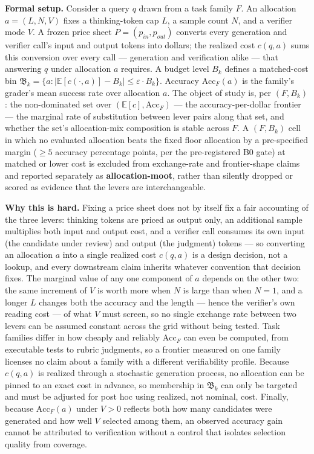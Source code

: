\documentclass[11pt]{article}
\begin{document}
\noindent\textbf{Formal setup.} Consider a query $q$ drawn from a task family $F$. An allocation $a = (L, N, V)$ fixes a thinking-token cap $L$, a sample count $N$, and a verifier mode $V$. A frozen price sheet $P = (p_{in}, p_{out})$ converts every generation and verifier call's input and output tokens into dollars; the realized cost $c(q,a)$ sums this conversion over every call --- generation and verification alike --- that answering $q$ under allocation $a$ requires. A budget level $B_k$ defines a matched-cost bin $\mathfrak{B}_k = \{a : |\mathbb{E}[c(\cdot,a)] - B_k| \leq \varepsilon \cdot B_k\}$. Accuracy $\text{Acc}_F(a)$ is the family's grader's mean success rate over allocation $a$. The object of study is, per $(F, B_k)$: the non-dominated set over $(\mathbb{E}[c], \text{Acc}_F)$ --- the accuracy-per-dollar frontier --- the marginal rate of substitution between lever pairs along that set, and whether the set's allocation-mix composition is stable across $F$. A $(F, B_k)$ cell in which no evaluated allocation beats the fixed floor allocation by a pre-specified margin ($\geq 5$ accuracy percentage points, per the pre-registered B0 gate) at matched or lower cost is excluded from exchange-rate and frontier-shape claims and reported separately as \textbf{allocation-moot}, rather than silently dropped or scored as evidence that the levers are interchangeable.

\noindent\textbf{Why this is hard.} Fixing a price sheet does not by itself fix a fair accounting of the three levers: thinking tokens are priced as output only, an additional sample multiplies both input and output cost, and a verifier call consumes its own input (the candidate under review) and output (the judgment) tokens --- so converting an allocation $a$ into a single realized cost $c(q,a)$ is a design decision, not a lookup, and every downstream claim inherits whatever convention that decision fixes. The marginal value of any one component of $a$ depends on the other two: the same increment of $V$ is worth more when $N$ is large than when $N=1$, and a longer $L$ changes both the accuracy and the length --- hence the verifier's own reading cost --- of what $V$ must screen, so no single exchange rate between two levers can be assumed constant across the grid without being tested. Task families differ in how cheaply and reliably $\text{Acc}_F$ can even be computed, from executable tests to rubric judgments, so a frontier measured on one family licenses no claim about a family with a different verifiability profile. Because $c(q,a)$ is realized through a stochastic generation process, no allocation can be pinned to an exact cost in advance, so membership in $\mathfrak{B}_k$ can only be targeted and must be adjusted for post hoc using realized, not nominal, cost. Finally, because $\text{Acc}_F(a)$ under $V>0$ reflects both how many candidates were generated and how well $V$ selected among them, an observed accuracy gain cannot be attributed to verification without a control that isolates selection quality from coverage.
\end{document}
